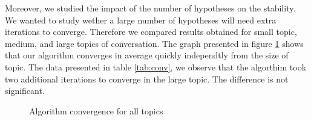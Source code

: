 \documentclass[sigconf]{aamas}  %
\begin{document}
	Moreover, we studied the impact of the number of hypotheses on the stability. We wanted to study wether a large number of hypotheses will need extra iterations to converge. Therefore we compared results obtained for small topic, medium, and large topics of conversation. The graph presented in figure \ref{converge} shows that our algorithm converges in average quickly independtly from the size of topic. The data presented in table \ref{tab:conv}, we observe that the algorthim took two additional iterations to converge in the large topic. The difference is not significant.
	
	
		\begin{figure}[]
			\caption{Algorithm convergence for all topics} 
			\label{converge}
		\end{figure}
	
	
\end{document}

